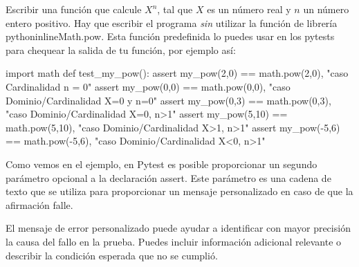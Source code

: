 \begin{ejercicio}
Escribir una función  que calcule $X^{n}$, tal que $X$ es un número real y $n$ un número entero positivo. Hay que escribir el programa \textit{sin} utilizar la función de librería pythoninline{Math.pow}. Esta función predefinida lo puedes usar en los pytests para chequear la salida de tu función, por ejemplo así:

\begin{small}
\begin{python}
import math
def test_my_pow():
    assert my_pow(2,0) == math.pow(2,0),   "caso Cardinalidad n = 0"
    assert my_pow(0,0) == math.pow(0,0),   "caso Dominio/Cardinalidad X=0 y n=0"
    assert my_pow(0,3) == math.pow(0,3),   "caso Dominio/Cardinalidad X=0, n>1"
    assert my_pow(5,10) == math.pow(5,10), "caso Dominio/Cardinalidad X>1, n>1"
    assert my_pow(-5,6) == math.pow(-5,6), "caso Dominio/Cardinalidad X<0, n>1"
\end{python}
\end{small}

Como vemos en el ejemplo, en Pytest es posible proporcionar un segundo parámetro opcional a la declaración assert. Este parámetro es una cadena de texto que se utiliza para proporcionar un mensaje personalizado en caso de que la afirmación falle.

El mensaje de error personalizado puede ayudar a identificar con mayor precisión la causa del fallo en la prueba. Puedes incluir información adicional relevante o describir la condición esperada que no se cumplió.
\end{ejercicio}



